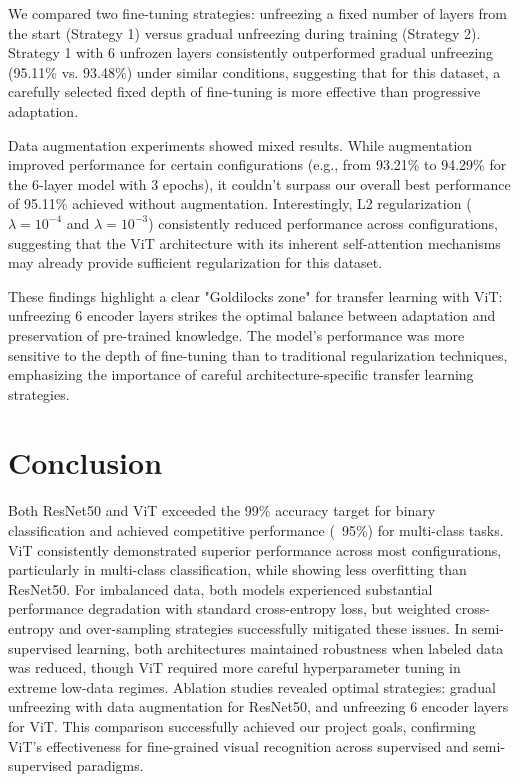 \documentclass{article}
\begin{document}
We compared two fine-tuning strategies: unfreezing a fixed number of layers from the start (Strategy 1) versus gradual unfreezing during training (Strategy 2). Strategy 1 with 6 unfrozen layers consistently outperformed gradual unfreezing (95.11\% vs. 93.48\%) under similar conditions, suggesting that for this dataset, a carefully selected fixed depth of fine-tuning is more effective than progressive adaptation.

Data augmentation experiments showed mixed results. While augmentation improved performance for certain configurations (e.g., from 93.21\% to 94.29\% for the 6-layer model with 3 epochs), it couldn't surpass our overall best performance of 95.11\% achieved without augmentation. Interestingly, L2 regularization ($\lambda=10^{-4}$ and $\lambda=10^{-3}$) consistently reduced performance across configurations, suggesting that the ViT architecture with its inherent self-attention mechanisms may already provide sufficient regularization for this dataset.

These findings highlight a clear "Goldilocks zone" for transfer learning with ViT: unfreezing 6 encoder layers strikes the optimal balance between adaptation and preservation of pre-trained knowledge. The model's performance was more sensitive to the depth of fine-tuning than to traditional regularization techniques, emphasizing the importance of careful architecture-specific transfer learning strategies.

\section{Conclusion}
Both ResNet50 and ViT exceeded the 99\% accuracy target for binary classification and achieved competitive performance (~95\%) for multi-class tasks. ViT consistently demonstrated superior performance across most configurations, particularly in multi-class classification, while showing less overfitting than ResNet50. For imbalanced data, both models experienced substantial performance degradation with standard cross-entropy loss, but weighted cross-entropy and over-sampling strategies successfully mitigated these issues. In semi-supervised learning, both architectures maintained robustness when labeled data was reduced, though ViT required more careful hyperparameter tuning in extreme low-data regimes. Ablation studies revealed optimal strategies: gradual unfreezing with data augmentation for ResNet50, and unfreezing 6 encoder layers for ViT. This comparison successfully achieved our project goals, confirming ViT's effectiveness for fine-grained visual recognition across supervised and semi-supervised paradigms.
\end{document}

